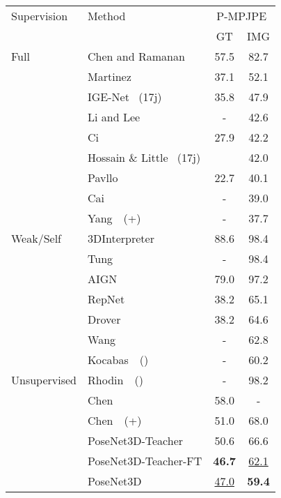 \documentclass[10pt,twocolumn,letterpaper]{article}
\begin{document}
\begin{table}[tb!]
	\centering
	\small
	\begin{adjustbox}{max width=0.99\textwidth}
	\begin{tabular}{llcc}
		\toprule
		Supervision & Method & \multicolumn{2}{c}{P-MPJPE} \\
		&   & GT & IMG\\
		\midrule 
		Full & Chen and Ramanan~\cite{ChenDeva2017}  & 57.5 & 82.7 \\
    	& Martinez~\etal~\cite{MartinezICCV2017}  & 37.1 & 52.1\\		
		& IGE-Net~\cite{IGENet} (17j)  & 35.8 & 47.9\\
		& Li and Lee~\cite{LiMDNCVPR19} &  - & 42.6\\
		& Ci~\etal~\cite{CiICCV2019GCN}    & 27.9 & 42.2\\
		& Hossain \& Little~\cite{rayat2018exploiting} (17j)  & & 42.0\\
		& Pavllo \etal~\cite{pavllo20193d}    & 22.7 & 40.1\\
		& Cai~\etal~\cite{CaiGCNICCV2019}    & - & 39.0\\
		& Yang~\etal~\cite{Yang_2018_CVPR}(+) & - & 37.7\\

		\midrule
		Weak/Self & 3DInterpreter~\cite{InterpreterNetwork2016}   & 88.6 & 98.4\\
		& Tung~\etal~\cite{tung_NIPS_2017}    & - & 98.4\\
		& AIGN~\cite{tung_2017_ICCV}    & 79.0 & 97.2\\
		& RepNet~\cite{RepNet} & 38.2 & 65.1\\
		& Drover~\etal~\cite{ZedNet_2018_ECCVW} & 38.2 & 64.6 \\
		&Wang~\etal~\cite{wang2019distill}   & - & 62.8\\
		& Kocabas~\etal~\cite{Kocabas_CVPR_2019}() & - & 60.2 \\
		
		\midrule
		Unsupervised & Rhodin~\etal~\cite{Rhodin_2018_ECCV}()  & - & 98.2 \\
		&Chen~\etal~\cite{chingCVPR2019} & 58.0 & -\\
		&Chen~\etal~\cite{chingCVPR2019}(+) & 51.0 & 68.0\\
		&PoseNet3D-Teacher   & 50.6 & 66.6 \\		&PoseNet3D-Teacher-FT  &\textbf{46.7} &  \underline{62.1}\\ 		&PoseNet3D  &\underline{47.0} &  \textbf{59.4}\\ 		


\end{tabular}
\end{adjustbox}
\end{table}
\end{document}
